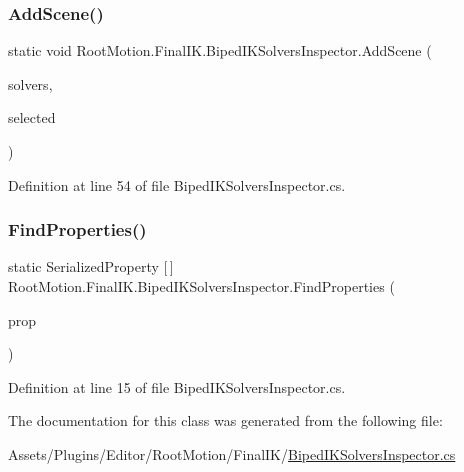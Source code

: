 \subsubsection{\texorpdfstring{Add\+Scene()}{AddScene()}}
{\footnotesize\ttfamily static void Root\+Motion.\+Final\+I\+K.\+Biped\+I\+K\+Solvers\+Inspector.\+Add\+Scene (\begin{DoxyParamCaption}\item[{Biped\+I\+K\+Solvers}]{solvers,  }\item[{ref int}]{selected }\end{DoxyParamCaption})\hspace{0.3cm}{\ttfamily [static]}}



Definition at line 54 of file Biped\+I\+K\+Solvers\+Inspector.\+cs.

\mbox{\label{class_root_motion_1_1_final_i_k_1_1_biped_i_k_solvers_inspector_a5960c0a01cbc595a4a9f981aaebed6ff}} 
\subsubsection{\texorpdfstring{Find\+Properties()}{FindProperties()}}
{\footnotesize\ttfamily static Serialized\+Property \mbox{[}$\,$\mbox{]} Root\+Motion.\+Final\+I\+K.\+Biped\+I\+K\+Solvers\+Inspector.\+Find\+Properties (\begin{DoxyParamCaption}\item[{Serialized\+Property}]{prop }\end{DoxyParamCaption})\hspace{0.3cm}{\ttfamily [static]}}



Definition at line 15 of file Biped\+I\+K\+Solvers\+Inspector.\+cs.



The documentation for this class was generated from the following file\+:\begin{DoxyCompactItemize}
\item 
Assets/\+Plugins/\+Editor/\+Root\+Motion/\+Final\+I\+K/\mbox{\hyperlink{_biped_i_k_solvers_inspector_8cs}{Biped\+I\+K\+Solvers\+Inspector.\+cs}}\end{DoxyCompactItemize}

